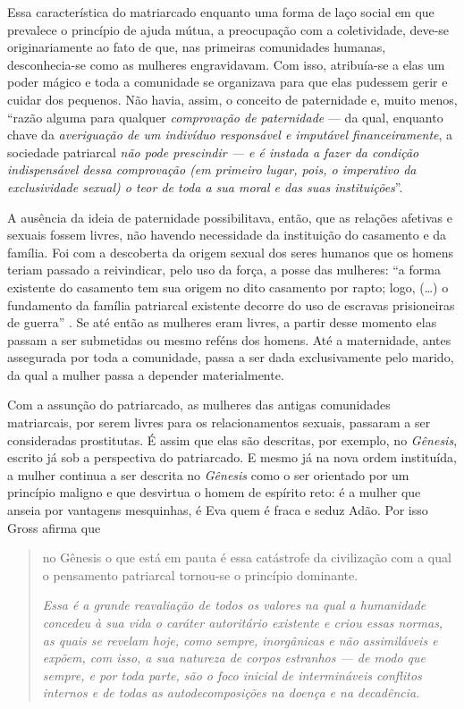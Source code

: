 Essa característica do matriarcado enquanto uma forma de laço social em
que prevalece o princípio de ajuda mútua, a preocupação com a
coletividade, deve-se originariamente ao fato de que, nas primeiras
comunidades humanas, desconhecia-se como as mulheres engravidavam. Com
isso, atribuía-se a elas um poder mágico e toda a comunidade se
organizava para que elas pudessem gerir e cuidar dos pequenos. Não
havia, assim, o conceito de paternidade e, muito menos, ``razão alguma
para qualquer \emph{comprovação de paternidade} --- da qual, enquanto
chave da \emph{averiguação de um indivíduo responsável e imputável
financeiramente}, a sociedade patriarcal \emph{não pode prescindir --- e
é instada a fazer da condição indispensável dessa comprovação (em
primeiro lugar, pois, o imperativo da exclusividade sexual) o teor de
toda a sua moral e das suas instituições}''.

A ausência da ideia de paternidade possibilitava, então, que as relações
afetivas e sexuais fossem livres, não havendo necessidade da instituição
do casamento e da família. Foi com a descoberta da origem sexual dos
seres humanos que os homens teriam passado a reivindicar, pelo uso da
força, a posse das mulheres: ``a forma existente do casamento tem sua
origem no dito casamento por rapto; logo, (\ldots{}) o fundamento da família
patriarcal existente decorre do uso de escravas prisioneiras de guerra''
. Se até então as mulheres eram livres, a partir desse momento elas
passam a ser submetidas ou mesmo reféns dos homens. Até a maternidade,
antes assegurada por toda a comunidade, passa a ser dada exclusivamente
pelo marido, da qual a mulher passa a depender materialmente.

Com a assunção do patriarcado, as mulheres das antigas comunidades
matriarcais, por serem livres para os relacionamentos sexuais, passaram
a ser consideradas prostitutas. É assim que elas são descritas, por
exemplo, no \emph{Gênesis}, escrito já sob a perspectiva do patriarcado.
E mesmo já na nova ordem instituída, a mulher continua a ser descrita no
\emph{Gênesis} como o ser orientado por um princípio maligno e que
desvirtua o homem de espírito reto: é a mulher que anseia por vantagens
mesquinhas, é Eva quem é fraca e seduz Adão. Por isso Gross afirma que

\begin{quote}
no Gênesis o que está em pauta é essa catástrofe da civilização com a
qual o pensamento patriarcal tornou-se o princípio dominante.

\emph{Essa é a grande reavaliação de todos os valores na qual a
humanidade concedeu à sua vida o caráter autoritário existente e criou
essas normas, as quais se revelam hoje, como sempre, inorgânicas e não
assimiláveis e expõem, com isso, a sua natureza de corpos estranhos ---
de modo que sempre, e por toda parte, são o foco inicial de
intermináveis conflitos internos e de todas as autodecomposições na
doença e na decadência}.
\end{quote}

